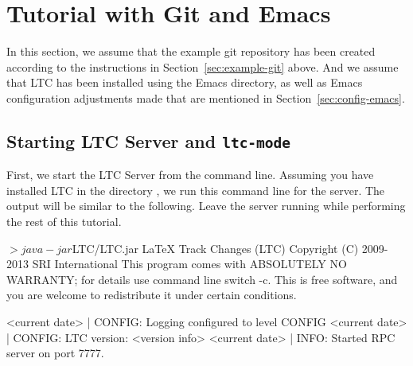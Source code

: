 \section{Tutorial with Git and Emacs} \label{sec:tutorial-git-emacs}

In this section, we assume that the example git repository has been created according to the instructions in Section~\ref{sec:example-git} above.  And we assume that LTC has been installed using the Emacs directory, as well as Emacs configuration adjustments made that are mentioned in Section~\ref{sec:config-emacs}.

\subsection{Starting LTC Server and \texttt{ltc-mode}}

First, we start the LTC Server from the command line.  Assuming you have installed LTC in the directory , we run this command line for the server.  The output will be similar to the following.  Leave the server running while performing the rest of this tutorial.
\begin{CodeVerbatim}
$> java -jar $LTC/LTC.jar
LaTeX Track Changes (LTC)  Copyright (C) 2009-2013  SRI International
This program comes with ABSOLUTELY NO WARRANTY; for details use command line switch -c.
This is free software, and you are welcome to redistribute it under certain conditions.

<current date> | CONFIG:  Logging configured to level CONFIG
<current date> | CONFIG:  LTC version: <version info>
<current date> | INFO:    Started RPC server on port 7777.
\end{CodeVerbatim}

